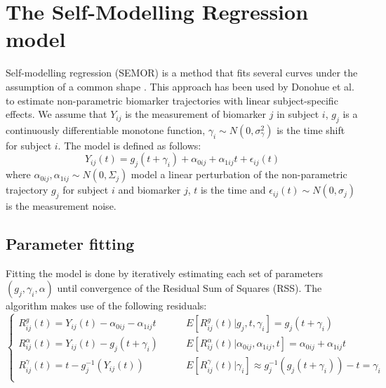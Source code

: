 \section{The Self-Modelling Regression model}
\label{sec:semor}

Self-modelling regression (SEMOR) is a method that fits several curves under the assumption of a common shape \cite{donohue2014estimating}. This approach has been used by Donohue et al. \cite{donohue2014estimating} to estimate non-parametric biomarker trajectories with linear subject-specific effects. We assume that $Y_{ij}$ is the measurement of biomarker $j$ in subject $i$, $g_j$ is a continuously differentiable monotone function, $\gamma_i \sim N(0, \sigma_{\gamma}^2)$ is the time shift for subject $i$. The model is defined as follows:
\begin{equation}
 \label{eq:semor1}
 Y_{ij}(t) = g_j(t +\gamma_i)+\alpha_{0ij} + \alpha_{1ij}t+\epsilon_{ij}(t)
\end{equation}
where $\alpha_{0ij}, \alpha_{1ij} \sim N(0, \Sigma_j)$ model a linear perturbation of the non-parametric trajectory $g_j$ for subject $i$ and biomarker $j$, $t$ is the time and $\epsilon_{ij}(t) \sim N(0, \sigma_j)$ is the measurement noise.  

\subsection{Parameter fitting}

Fitting the model is done by iteratively estimating each set of parameters $(g_j, \gamma_i, \alpha)$ until convergence of the Residual Sum of Squares (RSS). The algorithm makes use of the following residuals:
\begin{equation}
\begin{cases}
  R_{ij}^g(t) = Y_{ij}(t) - \alpha_{0ij} - \alpha_{1ij}t & \qquad E\left[ R_{ij}^g(t) | g_j, t, \gamma_i \right] = g_j(t+\gamma_i)\\
  R_{ij}^{\alpha}(t) = Y_{ij}(t) - g_j(t+\gamma_i) & \qquad E\left[ R_{ij}^{\alpha}(t) | \alpha_{0ij}, \alpha_{1ij}, t \right] = \alpha_{0ij} + \alpha_{1ij}t\\
  R_{ij}^{\gamma}(t) = t-g_j^{-1}(Y_{ij}(t)) & \qquad E\left[ R_{ij}^{\gamma}(t) | \gamma_i \right] \approx g_j^{-1}(g_j(t+\gamma_i))-t = \gamma_i\\  
\end{cases}  
\end{equation}


